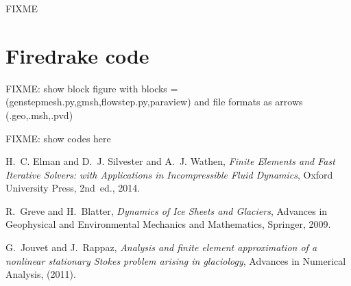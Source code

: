 \documentclass[letterpaper,final,12pt,reqno]{amsart}
\begin{document}
FIXME

\section{Firedrake code}

FIXME: show block figure with blocks = (genstepmesh.py,gmsh,flowstep.py,paraview) and file formats as arrows (.geo,.msh,.pvd)

FIXME: show codes here



\footnotesize

\bigskip

\begin{thebibliography}{3}



{\sc H.~C. Elman and D.~J. Silvester and A.~J. Wathen}, {\em Finite Elements
  and Fast Iterative Solvers: with Applications in Incompressible Fluid Dynamics},
  Oxford University Press, 2nd~ed., 2014.

{\sc R.~Greve and H.~Blatter}, {\em Dynamics of {I}ce {S}heets and {G}laciers},
  Advances in Geophysical and Environmental Mechanics and Mathematics,
  Springer, 2009.

{\sc G.~Jouvet and J.~Rappaz}, {\em Analysis and finite element approximation
  of a nonlinear stationary {S}tokes problem arising in glaciology}, Advances
  in Numerical Analysis, (2011).


\end{thebibliography}
\end{document}
